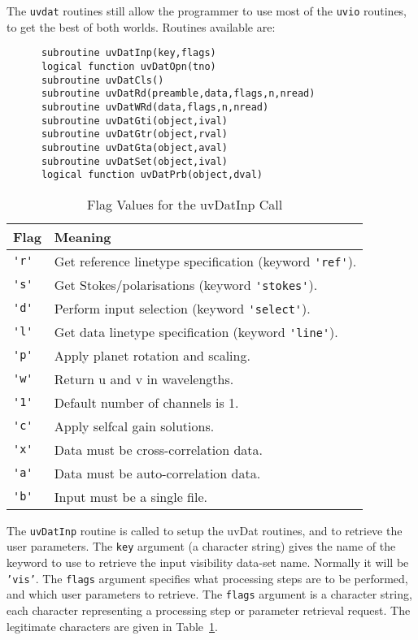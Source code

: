 \documentclass{report}
\begin{document}
The {\tt uvdat} routines still allow the programmer to use most of the {\tt uvio}
routines, to get the best of both worlds.
Routines available are:
\begin{verbatim}
      subroutine uvDatInp(key,flags)
      logical function uvDatOpn(tno)
      subroutine uvDatCls()
      subroutine uvDatRd(preamble,data,flags,n,nread)
      subroutine uvDatWRd(data,flags,n,nread)
      subroutine uvDatGti(object,ival)
      subroutine uvDatGtr(object,rval)
      subroutine uvDatGta(object,aval)
      subroutine uvDatSet(object,ival)
      logical function uvDatPrb(object,dval)
\end{verbatim}

\begin{table}\centering
\begin{tabular}{|l|l|} \hline
\bf Flag	& \bf Meaning \\ \hline
\verb+'r'+	& Get reference linetype specification (keyword \verb+'ref'+). \\
\verb+'s'+	& Get Stokes/polarisations (keyword \verb+'stokes'+). \\
\verb+'d'+	& Perform input selection (keyword \verb+'select'+). \\
\verb+'l'+	& Get data linetype specification (keyword \verb+'line'+). \\
\verb+'p'+	& Apply planet rotation and scaling. \\
\verb+'w'+	& Return u and v in wavelengths. \\
\verb+'1'+	& Default number of channels is 1.\\
\verb+'c'+	& Apply selfcal gain solutions.\\
\verb+'x'+	& Data must be cross-correlation data.\\
\verb+'a'+	& Data must be auto-correlation data.\\
\verb+'b'+	& Input must be a single file.\\ \hline
\end{tabular}
\caption{Flag Values for the uvDatInp Call}
\label{t:uvdatinp}
\end{table}

The {\tt uvDatInp} routine is called to setup the uvDat routines, and to
retrieve the user parameters. The {\tt key} argument (a character string)
gives the name of the keyword to use to retrieve the input visibility
data-set name. Normally it will be {\tt 'vis'}. The {\tt flags} argument
specifies what processing steps are to be
performed, and which user parameters to retrieve. The {\tt flags} argument is a
character string, each character representing a processing step or parameter
retrieval request. The legitimate characters are given in
Table~\ref{t:uvdatinp}.
\end{document}
